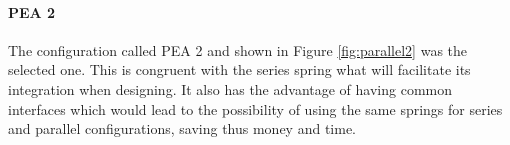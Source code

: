 \paragraph{PEA 2} %
\label{par:pea_2}
The configuration called PEA 2 and shown in Figure \ref{fig:parallel2} was the selected one.
This is congruent with the series spring what will facilitate its integration when designing.
It also has the advantage of having common interfaces which would lead to the possibility of using the same springs for series and parallel configurations, saving thus money and time.





